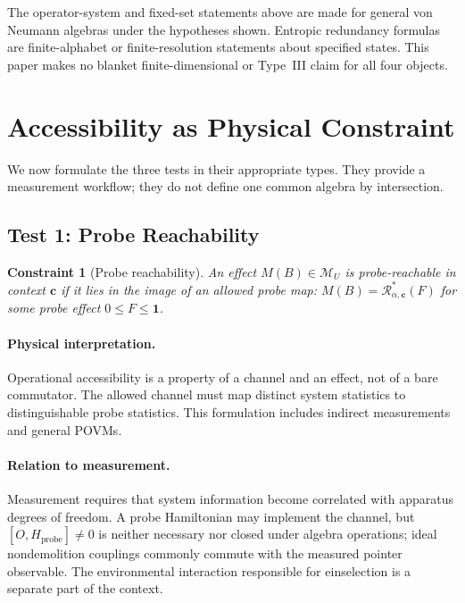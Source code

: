 \documentclass[12pt,a4paper]{article}
\newtheorem{constraint}[theorem]{Constraint}
\begin{document}
The operator-system and fixed-set statements above are made for general von Neumann algebras under the hypotheses shown.  Entropic redundancy formulas are finite-alphabet or finite-resolution statements about specified states.  This paper makes no blanket finite-dimensional or Type~III claim for all four objects.

\section{Accessibility as Physical Constraint}
\label{sec:constraints}

We now formulate the three tests in their appropriate types.  They provide a measurement workflow; they do not define one common algebra by intersection.

\subsection{Test 1: Probe Reachability}

\begin{constraint}[Probe reachability]
\label{const:interaction}
An effect $M(B)\in\mathcal M_U$ is probe-reachable in context $\mathbf c$ if it lies in the image of an allowed probe map: $M(B)=\mathcal R_{\alpha,\mathbf c}^{*}(F)$ for some probe effect $0\le F\le\mathbf1$.
\end{constraint}

\paragraph{Physical interpretation.}
Operational accessibility is a property of a channel and an effect, not of a bare commutator.  The allowed channel must map distinct system statistics to distinguishable probe statistics.  This formulation includes indirect measurements and general POVMs.

\paragraph{Relation to measurement.}
Measurement requires that system information become correlated with apparatus degrees of freedom.  A probe Hamiltonian may implement the channel, but $[O,H_{\mathrm{probe}}]\ne0$ is neither necessary nor closed under algebra operations; ideal nondemolition couplings commonly commute with the measured pointer observable.  The environmental interaction responsible for einselection is a separate part of the context.
\end{document}
